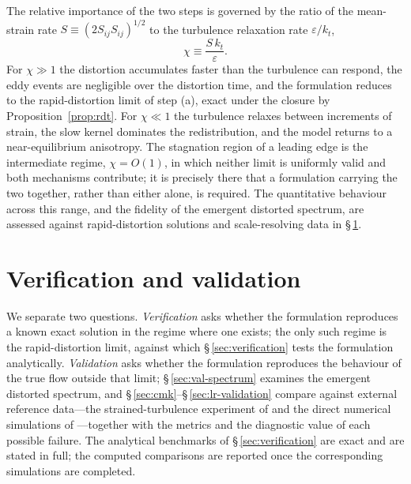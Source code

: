 \documentclass[lineno]{JFM-FLM_Au}
\begin{document}
The relative importance of the two steps is governed by the ratio of the
mean-strain rate $S\equiv(2S_{ij}S_{ij})^{1/2}$ to the turbulence
relaxation rate $\varepsilon/k_t$,
\begin{equation}
  \chi \equiv \frac{S\,k_t}{\varepsilon}.
  \label{eq:chi}
\end{equation}
For $\chi\gg1$ the distortion accumulates faster than the turbulence can
respond, the eddy events are negligible over the distortion time, and the
formulation reduces to the rapid-distortion limit of step (a), exact under
the closure by Proposition~\ref{prop:rdt}. For $\chi\ll1$ the turbulence
relaxes between increments of strain, the slow kernel dominates the
redistribution, and the model returns to a near-equilibrium anisotropy. The
stagnation region of a leading edge is the intermediate regime, $\chi=
O(1)$, in which neither limit is uniformly valid and both mechanisms
contribute; it is precisely there that a formulation carrying the two
together, rather than either alone, is required. The quantitative behaviour
across this range, and the fidelity of the emergent distorted spectrum, are
assessed against rapid-distortion solutions and scale-resolving data in
\S\,\ref{sec:validation}.

%
%

\section{Verification and validation}\label{sec:validation}

We separate two questions. \emph{Verification} asks whether the
formulation reproduces a known exact solution in the regime where one
exists; the only such regime is the rapid-distortion limit, against which
\S\,\ref{sec:verification} tests the formulation analytically. \emph{Validation}
asks whether the formulation reproduces the behaviour of the true flow
outside that limit; \S\,\ref{sec:val-spectrum} examines the emergent
distorted spectrum, and \S\,\ref{sec:cmk}--\S\,\ref{sec:lr-validation}
compare against external reference data---the strained-turbulence experiment
of \citet{ChenMeneveauKatz2006} and the direct numerical simulations of
\citet{LeeReynolds1985}---together with the metrics and the diagnostic value
of each possible failure. The analytical benchmarks of
\S\,\ref{sec:verification} are exact and are stated in full; the computed
comparisons are reported once the corresponding simulations are completed.
\end{document}
